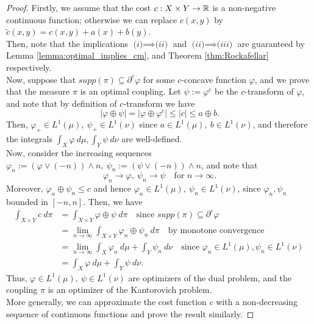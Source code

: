 \documentclass[../main.tex]{subfiles}
\begin{document}
\begin{proof}
    Firstly, we assume that the cost $c: X\times Y \to \mathbb{R}$ is a non-negative continuous function; otherwise we can replace $c(x, y)$ by $\tilde c(x, y) = c(x, y) + a(x) + b(y)$. \\
    Then, note that the implications $\textit{(i)}\implies\textit{(ii)}$ and $\textit{(ii)}\implies\textit{(iii)}$ are guaranteed by Lemma \ref{lemma:optimal_implies_cm}, and Theorem \ref{thm:Rockafellar} respectively. \\
    Now, suppose that $supp(\pi)\subseteq \partial^c \varphi$ for some $c$-concave function $\varphi$, and we prove that the measure $\pi$ is an optimal coupling. Let $\psi := \varphi^c$ be the $c$-transform of $\varphi$, and note that by definition of $c$-transform we have
    $$
    |\varphi\oplus\psi| 
    = |\varphi\oplus\varphi^c| 
    \leq |c| \leq a\oplus b.
    $$
    Then, $\varphi_+ \in L^1(\mu), \ \psi_+\in L^1(\nu)$ since $a\in L^1(\mu), \ b\in L^1(\nu)$, and therefore the integrals $\int_X \varphi \ d\mu, \int_Y \psi \ d\nu$ are well-defined. \\
    Now, consider the increasing sequences $\varphi_n := (\varphi \vee (-n))\wedge n, \ \psi_n := (\psi \vee (-n))\wedge n$, and note that
    $$
    \varphi_n \to \varphi, \ \psi_n\to \psi \quad \text{for } n\to\infty.
    $$
    Moreover, $\varphi_n\oplus\psi_n\leq c$ and hence $\varphi_n \in L^1(\mu), \ \psi_n\in L^1(\nu)$, since $\varphi_n, \psi_n$ bounded in $[-n,n]$. Then, we have
    \begin{align*}
        \int_{X\times Y} c \ d\pi 
        &= \int_{X\times Y} \varphi\oplus\psi \ d\pi \quad \text{since } supp(\pi)\subseteq \partial^c\varphi \\
        &= \lim_{n\to\infty}\int_{X\times Y} \varphi_n\oplus\psi_n \ d\pi \quad \text{by monotone convergence} \\
        &= \lim_{n\to\infty}\int_X \varphi_n \ d\mu + \int_Y \psi_n \ d\nu \quad \text{since } \varphi_n\in L^1(\mu), \psi_n\in L^1(\nu) \ \\
        &= \int_X \varphi \ d\mu + \int_Y \psi \ d\nu. 
    \end{align*}
    Thus, $\varphi\in L^1(\mu), \ \psi\in L^1(\nu)$ are optimizers of the dual problem, and the coupling $\pi$ is an optimizer of the Kantorovich problem. \\
    More generally, we can approximate the cost function $c$ with a non-decreasing sequence of continuous functions and prove the result similarly.
\end{proof}
\end{document}
